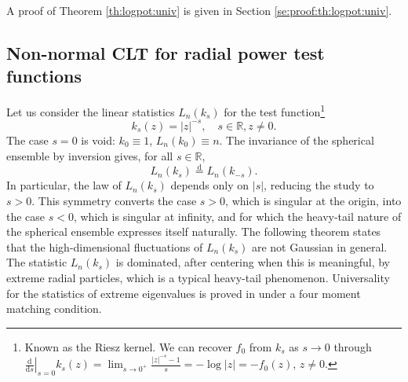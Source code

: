 \documentclass[10pt,reqno]{amsart}
\numberwithin{equation}{section}
\numberwithin{figure}{section}
\theoremstyle{plain}
\newcommand{\<}{\langle}
\renewcommand{\>}{\rangle}
\begin{document}
A proof of Theorem \ref{th:logpot:univ} is given in Section \ref{se:proof:th:logpot:univ}.

\subsection{Non-normal CLT for radial power test functions}

%

Let us consider the linear statistics $L_n(k_s)$ for the test function\footnote{Known as the Riesz kernel. We can recover $f_0$ from $k_s$ as $s\to0$ through
$\left.\tfrac{\mathrm{d}}{\mathrm{d}s}\right|_{s=0}k_s(z)=\lim_{s\to0^+}\frac{|z|^{-s}-1}{s}=-\log|z|=-f_0(z)$, $z\neq0$.}
\begin{equation}
k_s(z)=|z|^{-s}, \quad s\in\mathbb{R}, z\neq0.
\end{equation}
The case $s=0$ is void: $k_0\equiv1$, $L_n(k_0)\equiv n$.
The invariance of the spherical ensemble by inversion gives, for all $s\in\mathbb R$,
\begin{equation}
L_n(k_s)\overset{\mathrm d}=L_n(k_{-s}).
\end{equation}
In particular, the law of $L_n(k_s)$ depends only on $|s|$, reducing the study to
$s>0$. This symmetry converts the case $s>0$, which is singular at the origin, into the case $s<0$, which is singular at infinity, and for which the heavy-tail nature of the spherical ensemble expresses itself naturally. The following theorem states that the high-dimensional fluctuations of
$L_n(k_s)$ are not Gaussian in general. The statistic
$L_n(k_s)$ is dominated, after centering when this is meaningful, by extreme radial particles, which is a typical heavy-tail phenomenon. Universality for the statistics of extreme eigenvalues is proved in \cite{chafai-garcia-zelada-xu} under a four moment matching condition. 
\end{document}

